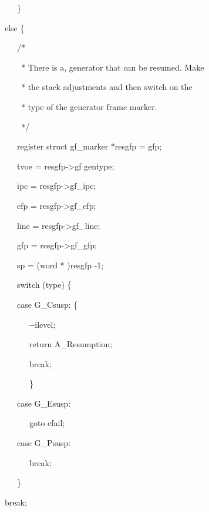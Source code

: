 {\ttfamily\mdseries
\ \ \ \ \ \ \ \ \ \}}

{\ttfamily\mdseries
\ \ \ \ \ \ else \{}

{\ttfamily\mdseries
\ \ \ \ \ \ \ \ \ /*}

{\ttfamily\mdseries
\ \ \ \ \ \ \ \ \ \ * There is a, generator that can be resumed. Make}

{\ttfamily\mdseries
\ \ \ \ \ \ \ \ \ \ * the stack adjustments and then switch on the}

{\ttfamily\mdseries
\ \ \ \ \ \ \ \ \ \ * type of the generator frame marker.}

{\ttfamily\mdseries
\ \ \ \ \ \ \ \ \ \ */}

{\ttfamily\mdseries
\ \ \ \ \ \ \ \ \ register struct gf\_marker *resgfp = gfp;}

{\ttfamily\mdseries
\ \ \ \ \ \ \ \ \ tvoe = resgfp-{\textgreater}gf gentype;}

{\ttfamily\mdseries
\ \ \ \ \ \ \ \ \ ipc = resgfp-{\textgreater}gf\_ipc;}

{\ttfamily\mdseries
\ \ \ \ \ \ \ \ \ efp = resgfp-{\textgreater}gf\_efp;}

{\ttfamily\mdseries
\ \ \ \ \ \ \ \ \ line = resgfp-{\textgreater}gf\_line;}

{\ttfamily\mdseries
\ \ \ \ \ \ \ \ \ gfp = resgfp-{\textgreater}gf\_gfp;}

{\ttfamily\mdseries
\ \ \ \ \ \ \ \ \ sp = (word * )resgfp -1;}

{\ttfamily\mdseries
\ \ \ \ \ \ \ \ \ switch (type) \{}


\ \ \ \ \ \ \ \ \ case G\_Csusp: \{


\ \ \ \ \ \ \ \ \ \ \ \ {}-{}-ilevel;

{\ttfamily\mdseries
\ \ \ \ \ \ \ \ \ \ \ \ return A\_Resumption;}

{\ttfamily\mdseries
\ \ \ \ \ \ \ \ \ \ \ \ \textrm{break;}}

{\ttfamily\mdseries
\ \ \ \ \ \ \ \ \ \ \ \ \}}

{\ttfamily\mdseries
\ \ \ \ \ \ \ \ \ case G\_Esusp:}

{\ttfamily\mdseries
\ \ \ \ \ \ \ \ \ \ \ \ goto efail;}

{\ttfamily\mdseries
\ \ \ \ \ \ \ \ \ case G\_Psusp:}

{\ttfamily\mdseries
\ \ \ \ \ \ \ \ \ \ \ \ break;}

{\ttfamily\mdseries
\ \ \ \ \ \ \ \ \ \}}

{\ttfamily\mdseries
\ \ \ \ \ \ break;}

